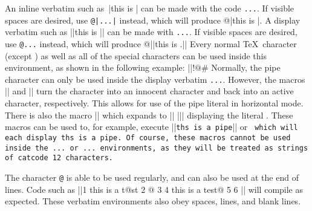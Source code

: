 An inline verbatim such as\ |this is \inline| can be made with the code {\tt\pipe...\pipe}. If visible spaces are desired, use 
{\tt @\string|...\string|} instead, which will produce @|this is \inline|. A display verbatim such as
||this is \display||
can be made with {\tt\pipe\pipe...\pipe\pipe}. If visible spaces are desired, use {\tt @\pipe\pipe...\pipe\pipe} instead, which will produce
@||this is \display.||
Every normal \TeX\ character (except {\tt\pipe}) as well as all of the special characters can be used inside this environment, as shown in the following example:
||!$@$#%
Normally, the pipe character {\tt\pipe} can only be used inside the display verbatim {\tt\pipe\pipe...\pipe\pipe}. However, the macros |\makepipeother| and |\makepipeactive| turn the character {\tt\pipe} into an innocent character and back into an active character, respectively. This allows for use of the pipe literal in horizontal mode.
There is also the macro |\pipe| which expands to
|| \bgroup\string|\egroup ||
displaying the literal {\tt\pipe}. These macros can be used to, for example, execute
||{\tt th\pipe{}s is a pipe}||
or
\begindisplay
\tt
\makepipeother
\string\makepipeother{}\string\makepipeactive
\makepipeactive
\enddisplay
which will each display {\tt th\pipe{}s is a pipe}. Of course, these macros cannot be used inside the {\tt\pipe...\pipe} or {\tt\pipe\pipe...\pipe\pipe} environments, as they will be treated as strings of catcode 12 characters.

The character {\tt @} is able to be used regularly, and can also be used at the end of lines. Code such as
||1 this is a t@st
2 @
3
4 this is a test@
5
6 \bye||
will compile as expected. These verbatim environments also obey spaces, lines, and blank lines.

\bye